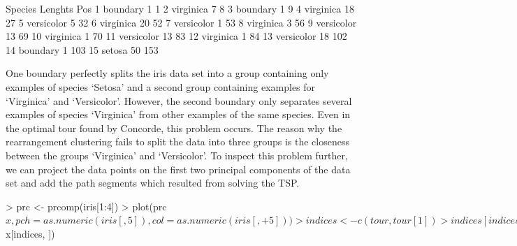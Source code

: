 \documentclass[10pt,a4paper,fleqn]{article}
\begin{document}
\begin{Schunk}
\begin{Soutput}
      Species Lenghts Pos
1    boundary       1   1
2   virginica       7   8
3    boundary       1   9
4   virginica      18  27
5  versicolor       5  32
6   virginica      20  52
7  versicolor       1  53
8   virginica       3  56
9  versicolor      13  69
10  virginica       1  70
11 versicolor      13  83
12  virginica       1  84
13 versicolor      18 102
14   boundary       1 103
15     setosa      50 153
\end{Soutput}
\end{Schunk}


One boundary perfectly splits the iris data set into a group containing
only examples of species `Setosa' and a second group containing examples
for `Virginica' and `Versicolor'.  However, the second boundary only
separates several examples of species `Virginica' from other examples of
the same species.  Even in the optimal tour found by Concorde, this
problem occurs. The reason why the rearrangement clustering fails to
split the data into three groups is the closeness between the groups
`Virginica' and `Versicolor'.  To inspect this problem further, we can
project the data points on the first two principal components of the
data set and add the path segments which resulted from solving the TSP.

\begin{Schunk}
\begin{Sinput}
> prc <- prcomp(iris[1:4])
> plot(prc$x, pch = as.numeric(iris[, 5]), col = as.numeric(iris[, 
+     5]))
> indices <- c(tour, tour[1])
> indices[indices > 150] <- NA
> lines(prc$x[indices, ])
\end{Sinput}
\end{Schunk}
\end{document}
